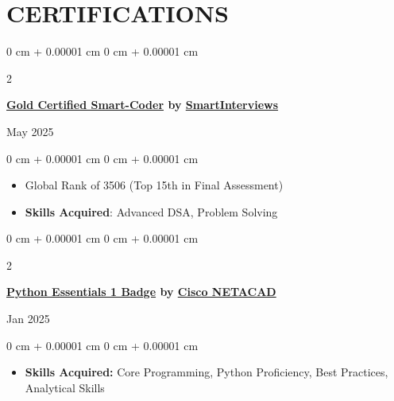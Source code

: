 \documentclass[10pt, letterpaper]{article}
\newenvironment{onecolentry}{
    \begin{adjustwidth}{
        0 cm + 0.00001 cm
    }{
        0 cm + 0.00001 cm
    }
}{
    \end{adjustwidth}
} %
\newenvironment{twocolentry}[2][]{
    \onecolentry
    \def\secondColumn{#2}
    \setcolumnwidth{\fill, 4.5 cm}
    \begin{paracol}{2}
}{
    \switchcolumn \raggedleft \secondColumn
    \end{paracol}
    \endonecolentry
} %
\begin{document}



    
    \section{CERTIFICATIONS}



        
        \begin{samepage}
            \begin{twocolentry}{
                May 2025
            }
                \textbf{\href{https://smartinterviews.in/certificate/cc3e44ac}{Gold Certified Smart-Coder} by \href{https://smartinterviews.in/}{SmartInterviews}}
            \end{twocolentry}
            
            \begin{onecolentry}
        \begin{itemize}
            \item  Global Rank of  3506 (Top 15th in Final Assessment)
            \item \textbf{Skills Acquired}: Advanced DSA, Problem Solving
        \end{itemize}
        \end{onecolentry}
        \end{samepage}
\vspace{0.20 cm}
  \begin{samepage}
            \begin{twocolentry}{
                Jan 2025
            }
                \textbf{\href{https://www.credly.com/badges/4719592f-0711-4e91-a096-3af7d9660c16}{Python Essentials 1 Badge} by \href{https://netacad.com/}{Cisco NETACAD}}
            \end{twocolentry}
            \begin{onecolentry}
                \begin{itemize}
                    \item \textbf{Skills Acquired:} Core Programming, Python Proficiency, Best Practices, Analytical Skills
                \end{itemize}
            \end{onecolentry}

        \end{samepage}
    
\end{document}
